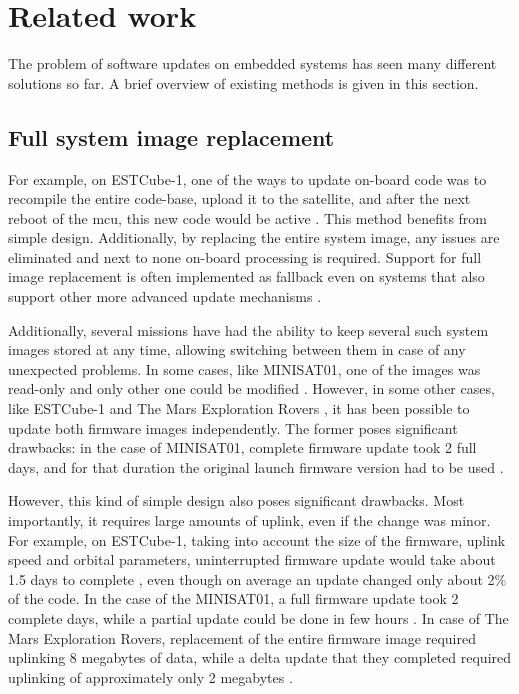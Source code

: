 \newpage
\section{Related work}
\label{s:relatedwork}

The problem
of software updates on embedded systems has seen many different solutions so far. A brief overview of existing methods is given in this section.

\subsection{Full system image replacement}

For example, on ESTCube-1, one of the ways to update on-board code was to recompile the entire code-base, upload it to the satellite, and after the next reboot of the \gls{mcu}, this new code would be active \cite{Suenter2016}. This method benefits from simple design. Additionally, by replacing the entire system image, any
 issues are eliminated and next to none on-board processing is required. Support for full image replacement is often implemented as fallback even on systems that also support other more advanced update mechanisms \cite{Tarbe2013,Greco2005,Garrido1998}.

Additionally, several missions have had the ability to keep several such system images stored at any time, allowing switching between them in case of any unexpected problems. In some cases, like MINISAT01, one of the images was read-only and only other one could be modified \cite{Garrido1998}. However, in some other cases, like  ESTCube-1 \cite{Tarbe2013} and The Mars Exploration Rovers \cite{Greco2005}, it has been possible to update both firmware images independently. The former poses significant drawbacks: in the case of MINISAT01, complete firmware update took 2 full days, and for that duration the original launch firmware version had to be used \cite{Garrido1998}.

However, this kind of simple design also poses significant drawbacks. Most importantly, it requires large amounts of uplink, even if the change was minor. For example, on ESTCube-1, taking into account the size of the firmware, uplink speed and orbital parameters, uninterrupted firmware update would take about 1.5 days to complete \cite{Suenter2014}, even though on average an update changed only about 2\% of the code. In the case of the MINISAT01, a full firmware update took 2 complete days, while a partial update could be done in few hours \cite{Garrido1998}. In case of The Mars Exploration Rovers, replacement of the entire firmware image required uplinking 8 megabytes of data, while a delta update that they completed required uplinking of approximately only 2 megabytes \cite{Greco2005}.

